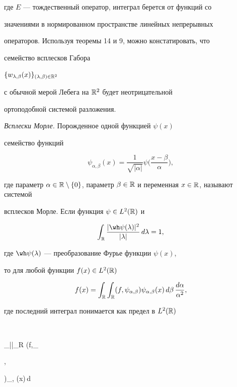 где $E$ --- тождественный оператор, интеграл берется от функций со


значениями в нормированном пространстве линейных непрерывных


операторов. Используя теоремы 14 и 9, можно констатировать, что


семейство всплесков Габора


$\{w_{\lambda,\beta}(x)\}_{(\lambda,\beta)\in\Bbb R^2}$


с обычной мерой Лебега на $\Bbb R^2$ будет неотрицательной


ортоподобной системой разложения.


\medskip





{\it Всплески Морле.} Порожденное одной функцией $\psi(x)$


семейство функций


$$


\psi_{\alpha, \beta}(x)=\frac1{\sqrt{|\alpha|}}\psi\bigg(\frac


{x-\beta}{\alpha}\bigg),


$$


где параметр $\alpha\in{\Bbb R}\setminus\{0\}$, параметр $\beta\in


{\Bbb R}$ и переменная $x\in{\Bbb R}$, называют системой


всплесков Морле. Если функция $\psi\in L^2(\Bbb R)$ и


$$


\int_{\Bbb R}\frac{|\wh\psi(\lambda)|^2}{|\lambda|}\,


d\lambda=1,


$$


где $\wh\psi(\lambda)$ --- преобразование Фурье функции $\psi(x)$,


то для любой функции $f(x)\in L^2(\Bbb R)$


$$


f(x)=\int_{\Bbb R}\int_{\Bbb R} (f, \psi_{\alpha,


\beta})\psi_{\alpha, \beta}(x)\,d\beta\,\frac{d\alpha}{\alpha^2},


$$


где последний интеграл понимается как предел в $L^2(\Bbb R)$


$$


\int_{|\alpha|\geqslant\varepsilon}\int_{\Bbb R} (f,\psi_{\alpha,


\beta})\psi_{\alpha, \beta}(x)\,d\beta\,


